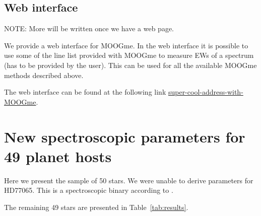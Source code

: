 \documentclass{aa}
\begin{document}
\subsection{Web interface}
\label{sub:Web interface}
NOTE: More will be written once we have a web page.

We provide a web interface for MOOGme. In the web interface it is
possible to use some of the line list provided with MOOGme to
measure EWs of a spectrum (has to be provided by the user). This
can be used for all the available MOOGme methods described above.

The web interface can be found at the following link
\url{super-cool-address-with-MOOGme}.



\section{New spectroscopic parameters for 49 planet hosts}
\label{sec:results}
Here we present the sample of 50 stars. We were unable to derive parameters for
HD77065. This is a spectroscopic binary according to \cite{Pourbaix2004}.

The remaining 49 stars are presented in Table~\ref{tab:results}.
\end{document}

